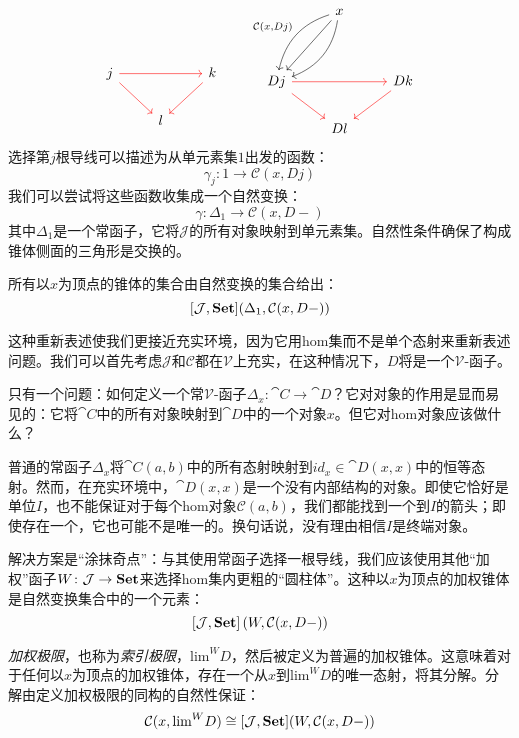 \documentclass[DaoFP]{subfiles}
\begin{document}
\[
 \begin{tikzcd}
 \\
 \\
j
\arrow[rr, red]
\arrow[rd, red]
&& k
\arrow[dl, red]
\\
& l
 \end{tikzcd}
 \qquad
 \begin{tikzcd}
  & x
 \arrow[ddl, ""']
 \arrow[ddl, bend right, "{\mathcal C(x, D j)}"']
 \arrow[ddl, bend left, ""]
 \\
\\
D j
\arrow[rr, red]
\arrow[rd, red]
&& D k
\arrow[dl, red]
\\
& D l
 \end{tikzcd}
 \]
选择第$j$根导线可以描述为从单元素集$1$出发的函数：
\[ \gamma_j \colon 1 \to \mathcal C(x, D j) \]
我们可以尝试将这些函数收集成一个自然变换：
\[ \gamma \colon \Delta_1 \to \mathcal C(x, D -) \]
其中$\Delta_1$是一个常函子，它将$\mathcal J$的所有对象映射到单元素集。自然性条件确保了构成锥体侧面的三角形是交换的。

所有以$x$为顶点的锥体的集合由自然变换的集合给出：
\[ [\mathcal J, \mathbf{Set}] (\Delta_1, \mathcal C(x, D-)) \]

这种重新表述使我们更接近充实环境，因为它用hom集而不是单个态射来重新表述问题。我们可以首先考虑$\mathcal J$和$\mathcal C$都在$\mathcal V$上充实，在这种情况下，$D$将是一个$\mathcal V$-函子。

只有一个问题：如何定义一个常$\mathcal V$-函子$\Delta_x \colon \cat C \to \cat D$？它对对象的作用是显而易见的：它将$\cat C$中的所有对象映射到$\cat D$中的一个对象$x$。但它对hom对象应该做什么？

普通的常函子$\Delta_x$将$\cat C(a, b)$中的所有态射映射到$id_x \in \cat D(x, x)$中的恒等态射。然而，在充实环境中，$\cat D(x, x)$是一个没有内部结构的对象。即使它恰好是单位$I$，也不能保证对于每个hom对象$\mathcal C(a, b)$，我们都能找到一个到$I$的箭头；即使存在一个，它也可能不是唯一的。换句话说，没有理由相信$I$是终端对象。

解决方案是“涂抹奇点”：与其使用常函子选择一根导线，我们应该使用其他“加权”函子$W \colon \mathcal J\to \mathbf{Set}$来选择hom集内更粗的“圆柱体”。这种以$x$为顶点的加权锥体是自然变换集合中的一个元素：
\[ [\mathcal J, \mathbf{Set}] \left(W, \mathcal C(x, D-)\right) \]

\emph{加权极限}，也称为\emph{索引极限}，$\text{lim}^W D$，然后被定义为普遍的加权锥体。这意味着对于任何以$x$为顶点的加权锥体，存在一个从$x$到$\text{lim}^W D$的唯一态射，将其分解。分解由定义加权极限的同构的自然性保证：
\[  \mathcal C(x, \text{lim}^W D) \cong [\mathcal J, \mathbf{Set}] (W, \mathcal C(x, D-)) \]
\end{document}
